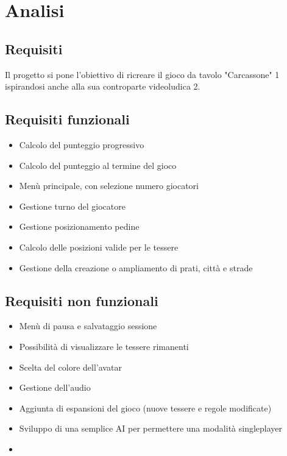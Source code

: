 \section{Analisi}
\subsection{Requisiti}
Il progetto si pone l'obiettivo di ricreare il gioco da tavolo "Carcassone" 1 ispirandosi anche alla sua controparte videoludica 2. 

\subsection*{Requisiti funzionali}
\begin{itemize}
\item Calcolo del punteggio progressivo
\item Calcolo del punteggio al termine del gioco
\item Menù principale, con selezione numero giocatori
\item Gestione turno del giocatore
\item Gestione posizionamento pedine
\item Calcolo delle posizioni valide per le tessere
\item Gestione della creazione o ampliamento di prati, città e strade
\end{itemize}

\subsection*{Requisiti non funzionali}
\begin{itemize}
\item Menù di pausa e salvataggio sessione
\item Possibilità di visualizzare le tessere rimanenti
\item Scelta del colore dell’avatar
\item Gestione dell’audio
\item Aggiunta di espansioni del gioco (nuove tessere e regole modificate)
\item Sviluppo di una semplice AI per permettere una modalità singleplayer
\item \end{itemize}

